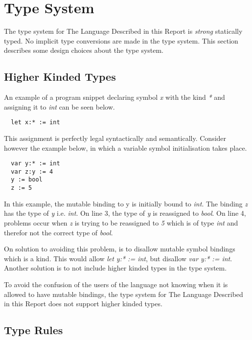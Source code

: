 \section{Type System}

The type system for The Language Described in this Report is \emph{strong} statically typed. No implicit type conversions are made in the type system. This section describes some design choices about the type system.

\subsection{Higher Kinded Types}
An example of a program snippet declaring symbol \emph{x} with the kind \emph{*} and assigning it to \emph{int} can be seen below.

\begin{verbatim}
  let x:* := int
\end{verbatim}

This assignment is perfectly legal syntactically and semantically. Consider however the example below, in which a variable symbol initialisation takes place.

\begin{verbatim}
  var y:* := int
  var z:y := 4
  y := bool
  z := 5
\end{verbatim}

In this example, the mutable binding to y is initially bound to \emph{int}. The binding \emph{z} has the type of \emph{y} i.e. \emph{int}. On line 3, the type of \emph{y} is reassigned to \emph{bool}. On line 4, problems occur when \emph{z} is trying to be reassigned to \emph{5} which is of type \emph{int} and therefor not the correct type of \emph{bool}.

On solution to avoiding this problem, is to disallow mutable symbol bindings which is a kind. This would allow \emph{let y:* := int}, but disallow \emph{var y:* := int}. Another solution is to not include higher kinded types in the type system.

To avoid the confusion of the users of the language not knowing when it is allowed to have mutable bindings, the type system for The Language Described in this Report does not support higher kinded types.

\subsection{Type Rules}

\newcommand{\Tpot}{^\wedge{}}
\newcommand{\Tint}{\text{int}}
\newcommand{\Treal}{\text{real}}
\newcommand{\Tbool}{\text{bool}}
\newcommand{\Tchar}{\text{char}}
\newcommand{\Tvoid}{\text{void}}
\newcommand{\Taop}{\text{AOP}}
\newcommand{\Tbaop}{\text{BAOP}}
\newcommand{\Tbbop}{\text{BBOP}}
\newcommand{\Tbl}{\text{BL}}
\newcommand{\Tbt}{\text{BT}}
\newcommand{\Tenv}{E \vdash}

